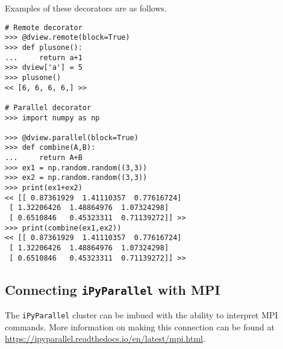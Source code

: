 Examples of these decorators are as follows.

\begin{lstlisting}
# Remote decorator
>>> @dview.remote(block=True)
>>> def plusone():
...     return a+1
>>> dview['a'] = 5
>>> plusone()
<< [6, 6, 6, 6,] >>

# Parallel decorator
>>> import numpy as np

>>> @dview.parallel(block=True)
>>> def combine(A,B):
...     return A+B
>>> ex1 = np.random.random((3,3))
>>> ex2 = np.random.random((3,3))
>>> print(ex1+ex2)
<< [[ 0.87361929  1.41110357  0.77616724]
 [ 1.32206426  1.48864976  1.07324298]
 [ 0.6510846   0.45323311  0.71139272]] >>
>>> print(combine(ex1,ex2))
<< [[ 0.87361929  1.41110357  0.77616724]
 [ 1.32206426  1.48864976  1.07324298]
 [ 0.6510846   0.45323311  0.71139272]] >>
 \end{lstlisting}

\subsection*{Connecting \texttt{iPyParallel} with MPI}
The \texttt{iPyParallel} cluster can be imbued with the ability to interpret MPI commands.
More information on making this connection can be found at \url{https://ipyparallel.readthedocs.io/en/latest/mpi.html}.


